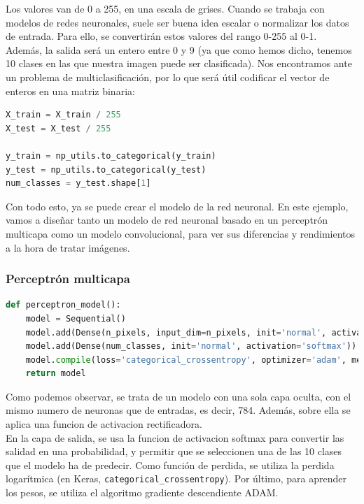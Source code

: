 Los valores van de 0 a 255, en una escala de grises. Cuando se trabaja con modelos de redes neuronales, suele ser buena idea escalar o normalizar los datos de entrada. Para ello, se convertirán estos valores del rango 0-255 al 0-1.\\
Además, la salida será un entero entre 0 y 9 (ya que como hemos dicho, tenemos 10 clases en las que nuestra imagen puede ser clasificada). Nos encontramos ante un problema de multiclasificación, por lo que será útil codificar el vector de enteros en una matriz binaria:
\begin{lstlisting}[language=Python]
X_train = X_train / 255
X_test = X_test / 255

y_train = np_utils.to_categorical(y_train)
y_test = np_utils.to_categorical(y_test)
num_classes = y_test.shape[1]
\end{lstlisting}

Con todo esto, ya se puede crear el modelo de la red neuronal. En este ejemplo, vamos a diseñar tanto un modelo de red neuronal basado en un perceptrón multicapa como un modelo convolucional, para ver sus diferencias y rendimientos a la hora de tratar imágenes.\\
\subsubsection{Perceptrón multicapa}
\begin{lstlisting}[language=Python]
def perceptron_model():
	model = Sequential()
	model.add(Dense(n_pixels, input_dim=n_pixels, init='normal', activation='relu'))
	model.add(Dense(num_classes, init='normal', activation='softmax'))
	model.compile(loss='categorical_crossentropy', optimizer='adam', metrics=['accuracy'])
	return model
\end{lstlisting}
Como podemos observar, se trata de un modelo con una sola capa oculta, con el mismo numero de neuronas que de entradas, es decir, 784. Además, sobre ella se aplica una funcion de activacion rectificadora.\\
En la capa de salida, se usa la funcion de activacion softmax para convertir las salidad en una probabilidad, y permitir que se seleccionen una de las 10 clases que el modelo ha de predecir. Como función de perdida, se utiliza la perdida logarítmica (en Keras, \lstinline{categorical_crossentropy}). Por último, para aprender los pesos, se utiliza el algoritmo gradiente descendiente ADAM.\\
